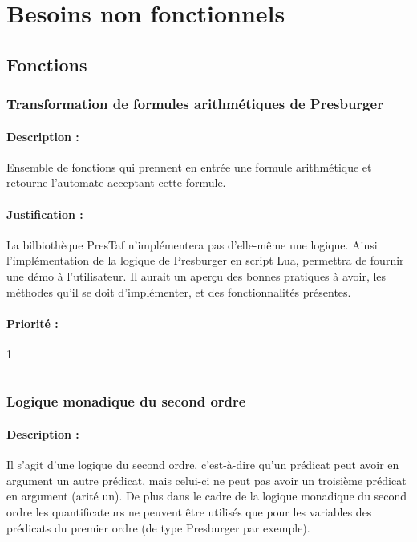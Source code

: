 \documentclass{article}%
\begin{document}
\section{Besoins non fonctionnels}

\subsection{Fonctions}

\subsubsection{Transformation de formules arithmétiques de Presburger}

\paragraph{Description :} Ensemble de fonctions qui prennent en entrée une formule arithmétique et retourne l'automate acceptant cette formule.

\paragraph{Justification :} La bilbiothèque PresTaf n'implémentera pas d'elle-même une logique. Ainsi l'implémentation de la logique de Presburger en script Lua, permettra de fournir une démo à l'utilisateur. Il aurait un aperçu des bonnes pratiques à avoir, les méthodes qu'il se doit d'implémenter, et des fonctionnalités présentes.

\paragraph{Priorité :} 1\\

\rule{\linewidth}{1pt}

\subsubsection{Logique monadique du second ordre}

\paragraph{Description :} Il s'agit d'une logique du second ordre, c'est-à-dire qu'un prédicat peut avoir en argument un autre prédicat, mais celui-ci ne peut pas avoir un troisième prédicat en argument (arité un). De plus dans le cadre de la logique monadique du second ordre les quantificateurs ne peuvent être utilisés que pour les variables des prédicats du premier ordre (de type Presburger par exemple).
\end{document}

